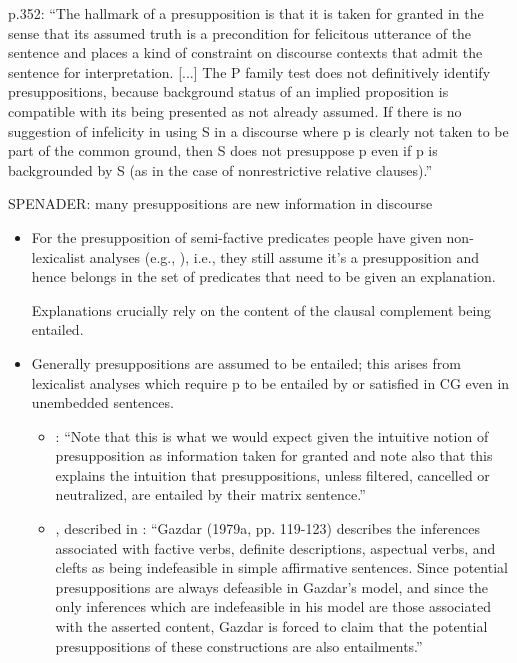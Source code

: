 \documentclass[11pt,fleqn]{article}
\newcommand{\6}{\mbox{$[\hspace*{-.6mm}[$}}
\newcommand{\9}{\mbox{$]\hspace*{-.6mm}]$}}
\begin{document}
{\begin{itemize}
p.352: ``The hallmark of a presupposition is that it is taken for granted in the sense that its assumed truth is a precondition for felicitous utterance of the sentence and places a kind of constraint on discourse contexts that admit the sentence for interpretation. [...] The P family test does not definitively identify presuppositions, because background status of an implied proposition is compatible with its being presented as not already assumed. If there is no suggestion of infelicity in using S in a discourse where p is clearly not taken to be part of the common ground, then S does not presuppose p even if p is backgrounded by S (as in the case of nonrestrictive relative clauses).''

SPENADER: many presuppositions are new information in discourse 


\end{itemize}

\newpage

\begin{itemize}

\item For the presupposition of semi-factive predicates people have given non-lexicalist analyses (e.g., \citealt{abrusan2011,abrusan2016,best-question}), i.e., they still assume it's a presupposition and hence belongs in the set of predicates that need to be given an explanation.

Explanations crucially rely on the content of the clausal complement being entailed.

\item Generally presuppositions are assumed to be entailed; this arises from lexicalist analyses which require p to be entailed by or satisfied in CG even in unembedded sentences.

\begin{itemize}

\item \citealt[345]{vds92}: ``Note that this is what we would expect given the intuitive notion of presupposition as information taken for granted and note also that this explains the intuition that presuppositions, unless filtered, cancelled or neutralized, are entailed by their matrix sentence.''

\item \citealt[119-123]{gazdar79a}, described in \citealt[66f.]{beaver01}: ``Gazdar (1979a, pp. 119-123) describes the inferences associated with factive verbs, definite descriptions, aspectual verbs, and clefts as being indefeasible in simple affirmative sentences. Since potential presuppositions are always defeasible in Gazdar's model, and since the only inferences which are indefeasible in his model are those associated with the asserted content, Gazdar is forced to claim that the potential presuppositions of these constructions are also entailments.''


\end{itemize}
\end{itemize}}
\end{document}
